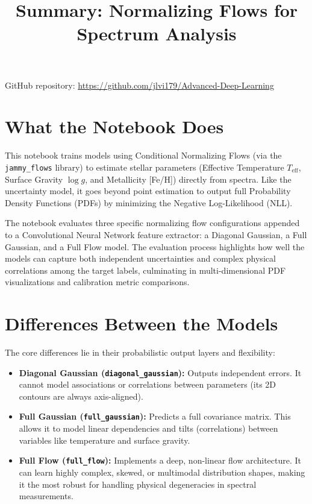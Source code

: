 \documentclass[11pt,a4paper]{article}
\title{Summary: Normalizing Flows for Spectrum Analysis}
\author{}
\date{}
\begin{document}
\maketitle

\noindent GitHub repository: \href{https://github.com/jlvi179/Advanced-Deep-Learning}{https://github.com/jlvi179/Advanced-Deep-Learning}

\section*{What the Notebook Does}

This notebook trains models using Conditional Normalizing Flows (via the \texttt{jammy\_flows} library) to estimate stellar parameters (Effective Temperature $T_{\text{eff}}$, Surface Gravity $\log g$, and Metallicity [Fe/H]) directly from spectra. Like the uncertainty model, it goes beyond point estimation to output full Probability Density Functions (PDFs) by minimizing the Negative Log-Likelihood (NLL).

The notebook evaluates three specific normalizing flow configurations appended to a Convolutional Neural Network feature extractor: a Diagonal Gaussian, a Full Gaussian, and a Full Flow model. The evaluation process highlights how well the models can capture both independent uncertainties and complex physical correlations among the target labels, culminating in multi-dimensional PDF visualizations and calibration metric comparisons.

\section*{Differences Between the Models}

The core differences lie in their probabilistic output layers and flexibility:

\begin{itemize}
    \item \textbf{Diagonal Gaussian (\texttt{diagonal\_gaussian}):} Outputs independent errors. It cannot model associations or correlations between parameters (its 2D contours are always axis-aligned).
    \item \textbf{Full Gaussian (\texttt{full\_gaussian}):} Predicts a full covariance matrix. This allows it to model linear dependencies and tilts (correlations) between variables like temperature and surface gravity. 
    \item \textbf{Full Flow (\texttt{full\_flow}):} Implements a deep, non-linear flow architecture. It can learn highly complex, skewed, or multimodal distribution shapes, making it the most robust for handling physical degeneracies in spectral measurements.
\end{itemize}
\end{document}
